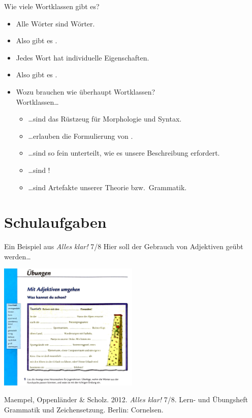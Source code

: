 \begin{frame}
  {Wie viele Wortklassen gibt es?}
  \pause
  \begin{itemize}[<+->]
    \item Alle Wörter sind \alert{Wörter}.
    \item Also gibt es .
      \Zeile
    \item Jedes Wort hat \alert{individuelle Eigenschaften}.
    \item Also gibt es .
      \Zeile
    \item Wozu brauchen wie überhaupt Wortklassen?\\
      Wortklassen\dots
      \begin{itemize}[<+->]
        \item \dots sind \alert{das Rüstzeug für Morphologie und Syntax}.
        \item \dots erlauben die Formulierung von .
        \item \dots sind so fein unterteilt, wie es unsere Beschreibung erfordert.
        \item \dots sind !
        \item \dots sind \alert{Artefakte unserer Theorie bzw.\ Grammatik}.
      \end{itemize}
  \end{itemize}
\end{frame}


\section{Schulaufgaben}

\begin{frame}
  {Ein Beispiel aus \textit{Alles klar!} 7\slash 8}
  Hier soll der Gebrauch von \alert{Adjektiven} geübt werden\ldots
  \begin{center}
    \includegraphics[width=0.5\textwidth]{graphics/adjektive1}
  \end{center}
  \tiny Maempel, Oppenländer \& Scholz. 2012. \textit{Alles klar!} 7\slash 8. Lern- und Übungsheft Grammatik und Zeichensetzung. Berlin: Cornelsen.
\end{frame}


